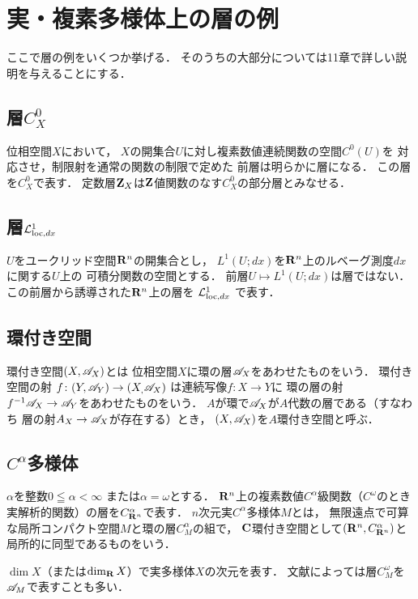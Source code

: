 \setcounter{section}{8}
\section{実・複素多様体上の層の例}
ここで層の例をいくつか挙げる．
そのうちの大部分については11章で詳しい説明を与えることにする．

\subsection{層\(C_X^0\)}
位相空間\(X\)において，
\(X\)の開集合\(U\)に対し複素数値連続関数の空間\(C^0(U)\)を
対応させ，制限射を通常の関数の制限で定めた
前層は明らかに層になる．
この層を\(C_X^0\)で表す．
定数層\(\zz_X\)は\(\zz\)値関数のなす\(C_X^0\)の部分層とみなせる．

\subsection{層\(\Lloc[dx]\)}
\(U\)をユークリッド空間\(\rr^n\)の開集合とし，
\(L^1(U;dx)\)を\(\rr^n\)上のルベーグ測度\(dx\)に関する\(U\)上の
可積分関数の空間とする．
前層\(U\mapsto L^1(U;dx)\)は層ではない．
この前層から誘導された\(\rr^n\)上の層を
\(\Lloc[dx]\)
で表す．

\subsection{環付き空間}
環付き空間\((X,\scA_X)\)とは
位相空間\(X\)に環の層\(\scA_X\)をあわせたものをいう．
環付き空間の射
\(f\colon(Y,\scA_Y)\to(X_,\scA_X)\)
は連続写像\(f\colon X\to Y\)に
環の層の射\(f^{-1}\scA_X\to\scA_Y\)をあわせたものをいう．
\(A\)が環で\(\scA_X\)が\(A\)代数の層である（すなわち
層の射\(A_X\to\scA_X\)が存在する）とき，
\((X,\scA_X)\)を\(A\)環付き空間と呼ぶ．

\subsection{\(C^\alpha\)多様体}
\(\alpha\)を整数\(0\leqq\alpha<\infty\)
または\(\alpha=\omega\)とする．
\(\rr^n\)上の複素数値\(C^\alpha\)級関数（\(C^\omega\)のとき
実解析的関数）の層を\(C^\alpha_{\rr^n}\)で表す．
\(n\)次元実\(C^\alpha\)多様体\(M\)とは，
無限遠点で可算な局所コンパクト空間\(M\)と環の層\(C^\alpha_M\)の組で，
\(\cc\)環付き空間として\((\rr^n,C^\alpha_{\rr^n})\)と
局所的に同型であるものをいう．

\(\dim X\)（または\(\dim_\rr X\)）で実多様体\(X\)の次元を表す．
文献によっては層\(C^\omega_M\)を\(\scA_M\)で表すことも多い．


